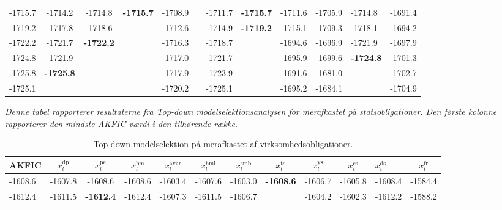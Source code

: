 \documentclass[
  a4paper,
  oneside]{memoir}
\begin{document}
\begin{landscape}
\begin{table}[H]
\begin{threeparttable}
\begin{tabular}[t]{lccccccccclc}
-1715.7 & -1714.2 & -1714.8 & \textbf{-1715.7} & -1708.9 &  & -1711.7 & \textbf{-1715.7} & -1711.6 & -1705.9 & -1714.8 & -1691.4\\
 
\rowcolor{gray!6}  -1719.2 & -1717.8 & -1718.6 &  & -1712.6 &  & -1714.9 & \textbf{-1719.2} & -1715.1 & -1709.3 & -1718.1 & -1694.2\\
 
-1722.2 & -1721.7 & \textbf{-1722.2} &  & -1716.3 &  & -1718.7 &  & -1694.6 & -1696.9 & -1721.9 & -1697.9\\
 
\rowcolor{gray!6}  -1724.8 & -1721.9 &  &  & -1717.0 &  & -1721.7 &  & -1695.9 & -1699.6 & \textbf{-1724.8} & -1701.3\\
 
-1725.8 & \textbf{-1725.8} &  &  & -1717.9 &  & -1723.9 &  & -1691.6 & -1681.0 &  & -1702.7\\
 
\rowcolor{gray!6}  -1725.1 &  &  &  & -1720.2 &  & -1725.1 &  & -1695.2 & -1684.1 &  & -1704.9\\
\bottomrule
\end{tabular}
\begin{tablenotes}
\item \textit{Denne tabel rapporterer resultaterne fra \textit{Top-down} modelselektionsanalysen for merafkastet på statsobligationer. Den første kolonne rapporterer den mindste AKFIC-værdi i den tilhørende række.}
\end{tablenotes}
\end{threeparttable}
\end{table}

\begin{table}[H]

\caption{\label{tab:STEP-V-TABLE}Top-down modelselektion på merafkastet af virksomhedsobligationer.}
\centering
\begin{threeparttable}
\begin{tabular}[t]{lccccccccclc}
\toprule
AKFIC & $x_t^{\text{dp}}$ & $x_t^{\text{pe}}$ & $x_t^{\text{bm}}$ & $x_t^{\text{avar}}$ & $x_t^{\text{hml}}$ & $x_t^{\text{smb}}$ & $x_t^{\text{ts}}$ & $x_t^{\text{ys}}$ & $x_t^{\text{cs}}$ & $x_t^{\text{ds}}$ & $x_t^{\text{fr}}$\\
\midrule
\rowcolor{gray!6}  -1608.6 & -1607.8 & -1608.6 & -1608.6 & -1603.4 & -1607.6 & -1603.0 & \textbf{-1608.6} & -1606.7 & -1605.8 & -1608.4 & -1584.4\\
 
-1612.4 & -1611.5 & \textbf{-1612.4} & -1612.4 & -1607.3 & -1611.5 & -1606.7 &  & -1604.2 & -1602.3 & -1612.2 & -1588.2\\
 

\end{tabular}
\end{threeparttable}
\end{table}
\end{landscape}
\end{document}
